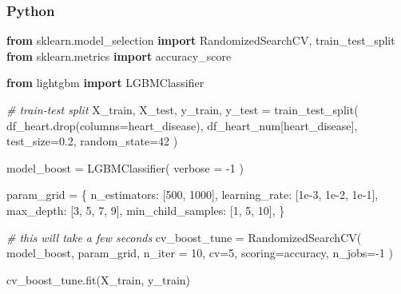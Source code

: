 \documentclass[
  letterpaper,
]{krantz}
\newenvironment{Shaded}{}{}
\newcommand{\CommentTok}[1]{\textcolor[rgb]{0.38,0.63,0.69}{\textit{#1}}}
\newcommand{\DecValTok}[1]{\textcolor[rgb]{0.25,0.63,0.44}{#1}}
\newcommand{\FloatTok}[1]{\textcolor[rgb]{0.25,0.63,0.44}{#1}}
\newcommand{\ImportTok}[1]{\textcolor[rgb]{0.00,0.50,0.00}{\textbf{#1}}}
\newcommand{\NormalTok}[1]{#1}
\newcommand{\OperatorTok}[1]{\textcolor[rgb]{0.40,0.40,0.40}{#1}}
\newcommand{\StringTok}[1]{\textcolor[rgb]{0.25,0.44,0.63}{#1}}
\begin{document}
\subsubsection{Python}

\begin{Shaded}
\begin{Highlighting}[]
\ImportTok{from}\NormalTok{ sklearn.model\_selection }\ImportTok{import}\NormalTok{ RandomizedSearchCV, train\_test\_split}
\ImportTok{from}\NormalTok{ sklearn.metrics }\ImportTok{import}\NormalTok{ accuracy\_score}

\ImportTok{from}\NormalTok{ lightgbm }\ImportTok{import}\NormalTok{ LGBMClassifier}

\CommentTok{\# train{-}test split}
\NormalTok{X\_train, X\_test, y\_train, y\_test }\OperatorTok{=}\NormalTok{ train\_test\_split(}
\NormalTok{    df\_heart.drop(columns}\OperatorTok{=}\StringTok{\textquotesingle{}heart\_disease\textquotesingle{}}\NormalTok{), df\_heart\_num[}\StringTok{\textquotesingle{}heart\_disease\textquotesingle{}}\NormalTok{], test\_size}\OperatorTok{=}\FloatTok{0.2}\NormalTok{, random\_state}\OperatorTok{=}\DecValTok{42}
\NormalTok{)}

\NormalTok{model\_boost }\OperatorTok{=}\NormalTok{ LGBMClassifier(}
\NormalTok{    verbose }\OperatorTok{=} \OperatorTok{{-}}\DecValTok{1}
\NormalTok{)}

\NormalTok{param\_grid }\OperatorTok{=}\NormalTok{ \{}
    \StringTok{\textquotesingle{}n\_estimators\textquotesingle{}}\NormalTok{: [}\DecValTok{500}\NormalTok{, }\DecValTok{1000}\NormalTok{],}
    \StringTok{\textquotesingle{}learning\_rate\textquotesingle{}}\NormalTok{: [}\FloatTok{1e{-}3}\NormalTok{, }\FloatTok{1e{-}2}\NormalTok{, }\FloatTok{1e{-}1}\NormalTok{],}
    \StringTok{\textquotesingle{}max\_depth\textquotesingle{}}\NormalTok{: [}\DecValTok{3}\NormalTok{, }\DecValTok{5}\NormalTok{, }\DecValTok{7}\NormalTok{, }\DecValTok{9}\NormalTok{],}
    \StringTok{\textquotesingle{}min\_child\_samples\textquotesingle{}}\NormalTok{: [}\DecValTok{1}\NormalTok{, }\DecValTok{5}\NormalTok{, }\DecValTok{10}\NormalTok{],}
\NormalTok{\}}

\CommentTok{\# this will take a few seconds}
\NormalTok{cv\_boost\_tune }\OperatorTok{=}\NormalTok{ RandomizedSearchCV(}
\NormalTok{    model\_boost, }
\NormalTok{    param\_grid, }
\NormalTok{    n\_iter }\OperatorTok{=} \DecValTok{10}\NormalTok{,}
\NormalTok{    cv}\OperatorTok{=}\DecValTok{5}\NormalTok{, }
\NormalTok{    scoring}\OperatorTok{=}\StringTok{\textquotesingle{}accuracy\textquotesingle{}}\NormalTok{, }
\NormalTok{    n\_jobs}\OperatorTok{={-}}\DecValTok{1}
\NormalTok{)}

\NormalTok{cv\_boost\_tune.fit(X\_train, y\_train)}
\end{Highlighting}
\end{Shaded}
\end{document}
